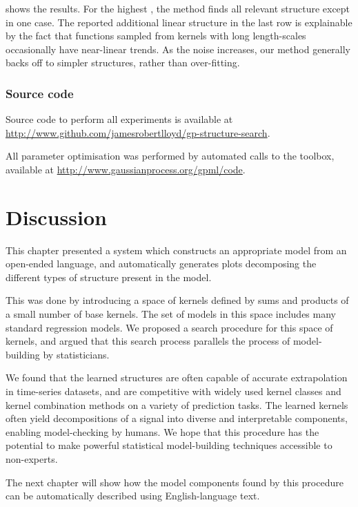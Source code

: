  shows the results.
For the highest \SNR{}, the method finds all relevant structure except in one case.
The reported additional linear structure in the last row is explainable by the fact that functions sampled from \kSE{} kernels with long length-scales occasionally have near-linear trends.
As the noise increases, our method generally backs off to simpler structures, rather than over-fitting.

\subsubsection{Source code}
Source code to perform all experiments is available at \\\url{http://www.github.com/jamesrobertlloyd/gp-structure-search}.

All \gp{} parameter optimisation was performed by automated calls to the \GPML{} toolbox, available at \url{http://www.gaussianprocess.org/gpml/code}.


\section{Discussion}

This chapter presented a system which constructs an appropriate model from an open-ended language, and automatically generates plots decomposing the different types of structure present in the model.

This was done by introducing a space of kernels defined by sums and products of a small number of base kernels.  
The set of models in this space includes many standard regression models.
We proposed a search procedure for this space of kernels, and argued that this search process parallels the process of model-building by statisticians.

We found that the learned structures are often capable of accurate extrapolation in time-series datasets, and are competitive with widely used kernel classes and kernel combination methods on a variety of prediction tasks.
The learned kernels often yield decompositions of a signal into diverse and interpretable components, enabling model-checking by humans.
We hope that this procedure has the potential to make powerful statistical model-building techniques accessible to non-experts.

The next chapter will show how the model components found by this procedure can be automatically described using English-language text.

\iffalse
